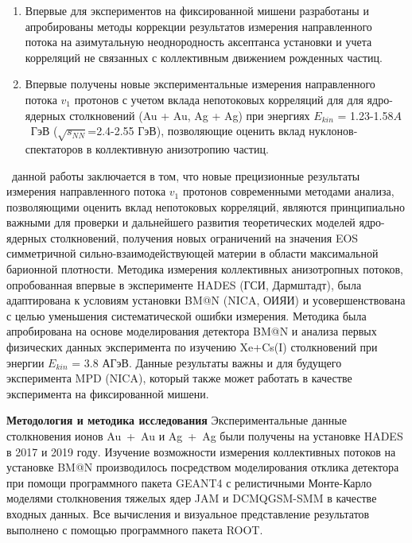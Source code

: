 \novelty
\begin{enumerate}
    \item Впервые для экспериментов на фиксированной мишени разработаны и апробированы методы коррекции результатов измерения направленного потока на азимутальную неоднородность аксептанса установки и учета корреляций не связанных с  коллективным движением рожденных частиц.

    \item Впервые получены новые экспериментальные измерения направленного потока $v_1$ протонов с учетом вклада непотоковых корреляций для для ядро-ядерных столкновений (Au + Au, Ag + Ag) при энергиях $E_{kin}$ = 1.23-1.58$A$~ГэВ ($\sqrt{s_{NN}}$=2.4-2.55 ГэВ), позволяющие оценить вклад нуклонов-спектаторов в коллективную анизотропию частиц.
\end{enumerate}
\influence\ данной работы заключается в том, что новые прецизионные результаты измерения направленного потока $v_1$ протонов современными методами анализа, позволяющими оценить вклад непотоковых корреляций, являются принципиально важными для проверки и дальнейшего развития теоретических моделей ядро-ядерных столкновений, получения новых ограничений на значения EOS симметричной сильно-взаимодействующей материи в области максимальной барионной плотности.
Методика измерения коллективных анизотропных потоков, опробованная впервые в эксперименте HADES (ГСИ, Дармштадт), была адаптирована к условиям установки BM@N (NICA, ОИЯИ) и усовершенствована с целью уменьшения систематической ошибки измерения. Методика была апробирована на основе моделирования детектора BM@N и анализа первых физических данных эксперимента по изучению Xe+Cs(I) столкновений при энергии $E_{kin}$ = 3.8 АГэВ.  
Данные результаты важны и  для будущего эксперимента MPD (NICA), который также может работать в качестве эксперимента на фиксированной мишени.

\textbf{Методология и методика исследования}
Экспериментальные данные столкновения ионов Au~+~Au и Ag~+~Ag были получены на установке HADES в 2017 и 2019 году. 
Изучение возможности измерения коллективных потоков на установке BM@N производилось посредством моделирования отклика детектора при помощи программного пакета GEANT4 с релистичными Монте-Карло моделями столкновения тяжелых ядер JAM и DCMQGSM-SMM в качестве входных данных.
Все вычисления и визуальное представление результатов выполнено с помощью программного пакета ROOT.

